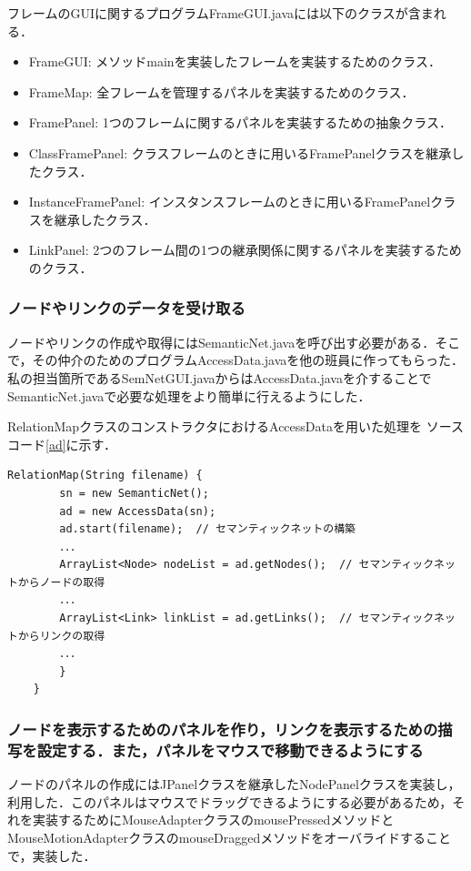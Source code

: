 \documentclass[12pt]{jarticle}
\begin{document}
フレームのGUIに関するプログラムFrameGUI.javaには以下のクラスが含まれる．
\begin{itemize}
\item FrameGUI: メソッドmainを実装したフレームを実装するためのクラス．
\item FrameMap: 全フレームを管理するパネルを実装するためのクラス．
\item FramePanel: 1つのフレームに関するパネルを実装するための抽象クラス．
\item ClassFramePanel: クラスフレームのときに用いるFramePanelクラスを継承したクラス．
\item InstanceFramePanel: インスタンスフレームのときに用いるFramePanelクラスを継承したクラス．
\item LinkPanel: 2つのフレーム間の1つの継承関係に関するパネルを実装するためのクラス．
\end{itemize}

\subsubsection{ノードやリンクのデータを受け取る}
ノードやリンクの作成や取得にはSemanticNet.javaを呼び出す必要がある．そこで，その仲介のためのプログラムAccessData.javaを他の班員に作ってもらった．私の担当箇所であるSemNetGUI.javaからはAccessData.javaを介することでSemanticNet.javaで必要な処理をより簡単に行えるようにした．

RelationMapクラスのコンストラクタにおけるAccessDataを用いた処理を
ソースコード\ref{ad}に示す．

\begin{lstlisting}[caption=RelationMapクラスのコンストラクタ, label=ad]
    RelationMap(String filename) {
        sn = new SemanticNet();
        ad = new AccessData(sn);
        ad.start(filename);  // セマンティックネットの構築
        ．．．
        ArrayList<Node> nodeList = ad.getNodes();  // セマンティックネットからノードの取得
        ．．．
        ArrayList<Link> linkList = ad.getLinks();  // セマンティックネットからリンクの取得
        ．．．
        }
    }
\end{lstlisting}

\subsubsection{ノードを表示するためのパネルを作り，リンクを表示するための描写を設定する．また，パネルをマウスで移動できるようにする}
ノードのパネルの作成にはJPanelクラスを継承したNodePanelクラスを実装し，利用した．このパネルはマウスでドラッグできるようにする必要があるため，それを実装するためにMouseAdapterクラスのmousePressedメソッドとMouseMotionAdapterクラスのmouseDraggedメソッドをオーバライドすることで，実装した．
\end{document}
